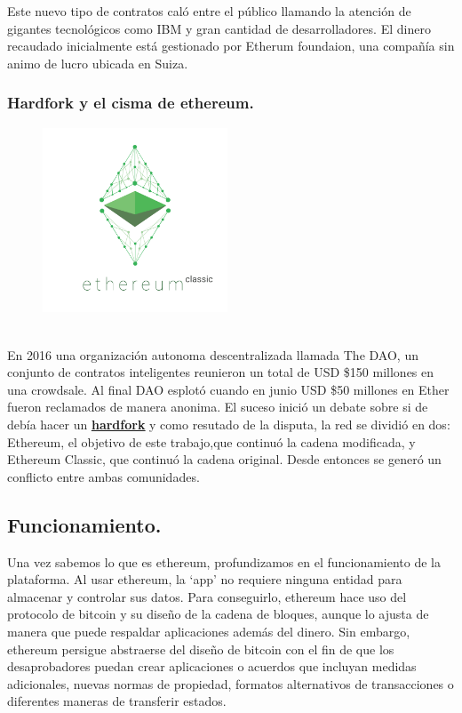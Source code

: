\documentclass[11pt,a4paper]{article}
\begin{document}
Este nuevo tipo de contratos caló entre el público llamando la atención de gigantes tecnológicos como IBM y gran cantidad de desarrolladores. El dinero recaudado inicialmente está gestionado por Etherum foundaion\footnotemark, una compañía sin animo de lucro ubicada en Suiza.	\\


\subsubsection{Hardfork y el cisma de ethereum.}
\label{sec:dao}
\begin{figure}
  \caption{\ \ }
  \includegraphics[width=5.5cm]{images/classic1.png}
\end{figure} 
En 2016 una organización autonoma descentralizada llamada The DAO, un conjunto de contratos inteligentes reunieron un total de USD \$150 millones en una crowdsale. Al final DAO esplotó cuando en junio USD \$50 millones en Ether fueron reclamados de manera anonima. El suceso inició un debate sobre si de debía hacer un 
\hyperref[sec:hardfork]{\textbf{\underline{hardfork}}} y como resutado de la disputa, la red se dividió en dos: Ethereum, el objetivo de este trabajo,que continuó la cadena modificada, y Ethereum Classic, que continuó la cadena original. Desde entonces se generó un conflicto entre ambas comunidades.\\


\subsection{Funcionamiento.\\} 
Una vez sabemos lo que es ethereum, profundizamos en el funcionamiento de la plataforma.
Al usar ethereum, la ‘app’ no requiere ninguna entidad para almacenar y controlar sus datos. Para conseguirlo, ethereum hace uso del protocolo de bitcoin y su diseño de la cadena de bloques, aunque lo ajusta de manera que puede respaldar aplicaciones además del dinero. Sin embargo, ethereum persigue abstraerse del diseño de bitcoin con el fin de que los desaprobadores puedan crear aplicaciones o acuerdos que incluyan medidas adicionales, nuevas normas de propiedad, formatos alternativos de transacciones o diferentes maneras de transferir estados.\\
\end{document}
